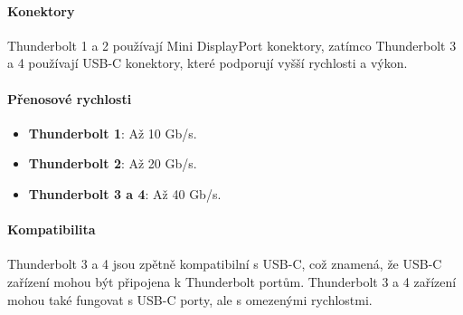 \paragraph{Konektory}
Thunderbolt 1 a 2 používají Mini DisplayPort konektory, zatímco Thunderbolt 3 a 4 používají USB-C konektory, které podporují vyšší rychlosti a výkon.

\paragraph{Přenosové rychlosti}
\begin{itemize}
\item \textbf{Thunderbolt 1}: Až 10 Gb/s.
\item \textbf{Thunderbolt 2}: Až 20 Gb/s.
\item \textbf{Thunderbolt 3 a 4}: Až 40 Gb/s.
\end{itemize}

\paragraph{Kompatibilita}
Thunderbolt 3 a 4 jsou zpětně kompatibilní s USB-C, což znamená, že USB-C zařízení mohou být připojena k Thunderbolt portům. Thunderbolt 3 a 4 zařízení mohou také fungovat s USB-C porty, ale s omezenými rychlostmi.